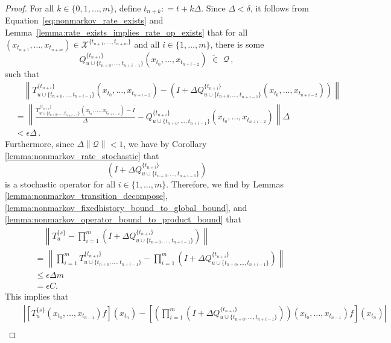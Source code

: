 \documentclass[10pt]{paper}
\newcommand{\states}{\mathcal{X}}
\newcommand{\norm}[1]{\left\lVert #1 \right\rVert}
\newcommand{\coloneqq}{:\!=}
\newcommand{\opinset}{\,\,\widetilde{\in}\,\,}
\begin{document}
\begin{proof}
For all $k\in\{0,1,\ldots,m\}$, define $t_{n+k}\coloneqq t+k\Delta$. Since $\Delta<\delta$, it follows from Equation~\eqref{eq:nonmarkov_rate_exists} and Lemma~\ref{lemma:rate_exists_implies_rate_op_exists} that for all $(x_{t_{n+1}},\ldots,x_{t_{n+m}})\in\states^{\{t_{n+1},\ldots,t_{n+m}\}}$ and all $i\in\{1,\ldots,m\}$, there is some
\begin{equation*}
Q_{u\cup\{t_{n+0},\ldots,t_{n+i-1}\}}^{\{t_{n+i}\}}(x_{t_0},\ldots,x_{t_{n+i-2}})\opinset\mathcal{Q}\,,
\end{equation*}
such that
\begin{align*}
&\quad \norm{T_{u\cup\{t_{n+0},\ldots,t_{n+i-1}\}}^{\{t_{n+i}\}}(x_{t_0},\ldots,x_{t_{n+i-2}}) - \left(I + \Delta Q_{u\cup\{t_{n+0},\ldots,t_{n+i-1}\}}^{\{t_{n+i}\}}(x_{t_0},\ldots,x_{t_{n+i-2}})\right)} \\
 &= \norm{\frac{T_{u\cup\{t_{n+0},\ldots,t_{n+i-1}\}}^{\{t_{n+i}\}}(x_{t_0},\ldots,x_{t_{n+i-2}}) - I}{\Delta} - Q_{u\cup\{t_{n+0},\ldots,t_{n+i-1}\}}^{\{t_{n+i}\}}(x_{t_0},\ldots,x_{t_{n+i-2}})}\Delta \\
 &<\epsilon\Delta\,.
\end{align*}
Furthermore, since $\Delta\norm{\mathcal{Q}}<1$, we have by Corollary \ref{lemma:nonmarkov_rate_stochastic} that
\begin{equation*}
\left(I + \Delta Q_{u\cup\{t_{n+0},\ldots,t_{n+i-1}\}}^{\{t_{n+i}\}}\right)
\end{equation*}
is a stochastic operator for all $i\in\{1,\ldots,m\}$. Therefore, we find by Lemmas \ref{lemma:nonmarkov_transition_decompose}, \ref{lemma:nonmarkov_fixedhistory_bound_to_global_bound}, and \ref{lemma:nonmarkov_operator_bound_to_product_bound} that
\begin{align*}
&\quad \norm{T_u^{\{s\}} - \prod_{i=1}^m\left(I + \Delta Q_{u\cup\{t_{n+0},\ldots,t_{n+i-1}\}}^{\{t_{n+i}\}}\right)} \\
&= \norm{\prod_{i=1}^m T_{u\cup\{t_{n+0},\ldots,t_{n+i-1}\}}^{\{t_{n+i}\}} - \prod_{i=1}^m\left(I + \Delta Q_{u\cup\{t_{n+0},\ldots,t_{n+i-1}\}}^{\{t_{n+i}\}}\right)} \\
&\leq \epsilon\Delta m \\
&= \epsilon C.
\end{align*}
This implies that
\begin{align*}
&\quad\left\vert \left[T_{u}^{\{s\}}(x_{t_0},\ldots,x_{t_{n-1}})f\right](x_{t_n}) - \left[\left(\prod_{i=1}^m\left(I + \Delta Q_{u\cup\{t_{n+0},\ldots,t_{n+i-1}\}}^{\{t_{n+i}\}}\right)\right)(x_{t_0},\ldots,x_{t_{n-1}})f\right](x_{t_n})\right\vert \\

\end{align*}
\end{proof}
\end{document}

